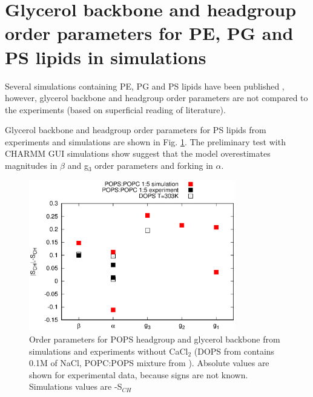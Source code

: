 \documentclass[aps,prl,superscriptaddress,twocolumn]{revtex4}
\begin{document}
\section{Glycerol backbone and headgroup order parameters for PE, PG and PS lipids in simulations}

Several simulations containing PE, PG and PS lipids have been published \cite{??},
however, glycerol backbone and headgroup order parameters are not compared to
the experiments (based on superficial reading of literature).

Glycerol backbone and headgroup order parameters for PS lipids from experiments
and simulations are shown in Fig. \ref{HGorderParametersPOPS}.
The preliminary test with CHARMM GUI simulations show suggest that the model
overestimates magnitudes in $\beta$ and g$_3$ order parameters and forking in $\alpha$.
\begin{figure}[]
  \centering
  \includegraphics[width=9.0cm]{../Figs/HGorderparametersPOPS.eps}
  \caption{\label{HGorderParametersPOPS}
    Order parameters for POPS headgroup and glycerol backbone from simulations and experiments without CaCl$_2$ 
    (DOPS from \cite{browning80} contains 0.1M of NaCl, POPC:POPS mixture from \cite{roux90}).
    Absolute values are shown for experimental data, because signs are not known.
    Simulations values are -S$_{CH}$
  }
\end{figure}
\end{document}
